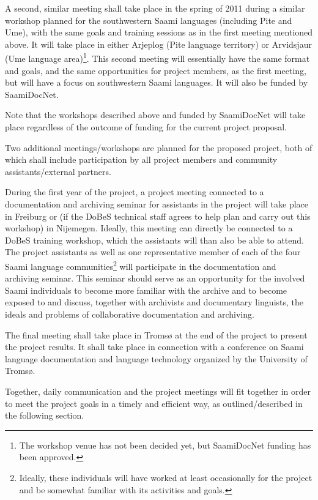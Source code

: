 \documentclass[a4paper,12pt]{article}
\begin{document}
{{{{A second, similar meeting shall take place in the spring of 2011 during a similar workshop planned for the southwestern Saami languages (including Pite and Ume), with the same goals and training sessions as in the first meeting mentioned above. It will take place in either Arjeplog (Pite language territory) or Arvidsjaur (Ume language area)\footnote{The workshop venue has not been decided yet, but SaamiDocNet funding has been approved.}. This second meeting will essentially have the same format and goals, and the same opportunities for project members, as the first meeting, but will have a focus on southwestern Saami languages. It will also be funded by SaamiDocNet.

Note that the workshops described above and funded by SaamiDocNet will take place regardless of the outcome of funding for the current project proposal.

Two additional meetings/workshops are planned for the proposed project, both of which shall include participation by all project members and community assistants/external partners.%

During the first year of the project, a project meeting connected to a documentation and archiving seminar for assistants in the project will take place in Freiburg or (if the DoBeS technical staff agrees to help plan and carry out this workshop) in Nijemegen. Ideally, this meeting can directly be connected to a DoBeS training workshop, which the assistants will than also be able to attend. The project assistants as well as one representative member of each of the four Saami language communities\footnote{Ideally, these individuals will have worked at least occasionally for the project and be somewhat familiar with its activities and goals.} will participate in the documentation and archiving seminar. This seminar should serve as an opportunity for the involved Saami individuals to become more familiar with the archive and to become exposed to and discuss, together with archivists and documentary linguists, the ideals and problems of collaborative documentation and archiving.%

The final meeting shall take place in Tromsø at the end of the project to present the project results. It shall take place in connection with a conference on Saami language documentation and language technology organized by the University of Tromsø.

Together, daily communication and the project meetings will fit together in order to meet the project goals in a timely and efficient way, as outlined/described in the following section.

}}}}
\end{document}
